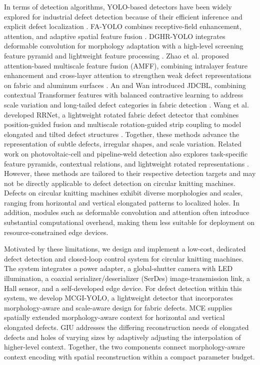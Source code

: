 \documentclass[journal]{IEEEtranTIE}
\newcommand{\model}{MCGI-YOLO\xspace}
\begin{document}
In terms of detection algorithms, YOLO-based detectors have been widely explored for industrial defect detection because of their efficient inference and explicit defect localization \cite{redmon2016yolo}. FA-YOLO combines receptive-field enhancement, attention, and adaptive spatial feature fusion \cite{yu2024fayolo}. DGHR-YOLO integrates deformable convolution for morphology adaptation with a high-level screening feature pyramid and lightweight feature processing \cite{zhang2025dghr}. Zhao et al. proposed attention-based multiscale feature fusion (AMFF), combining intralayer feature enhancement and cross-layer attention to strengthen weak defect representations on fabric and aluminum surfaces \cite{zhao2024amff}. An and Wan introduced JDCBL, combining contextual Transformer features with balanced contrastive learning to address scale variation and long-tailed defect categories in fabric detection \cite{an2025jdcbl}. Wang et al. developed RRNet, a lightweight rotated fabric defect detector that combines position-guided fusion and multiscale rotation-guided strip coupling to model elongated and tilted defect structures \cite{wang2026rrnet}. Together, these methods advance the representation of subtle defects, irregular shapes, and scale variation. Related work on photovoltaic-cell and pipeline-weld detection also explores task-specific feature pyramids, contextual relations, and lightweight rotated representations \cite{su2022baf,shen2024crnet,liu2025lrnet}. However, these methods are tailored to their respective detection targets and may not be directly applicable to defect detection on circular knitting machines. Defects on circular knitting machines exhibit diverse morphologies and scales, ranging from horizontal and vertical elongated patterns to localized holes. In addition, modules such as deformable convolution and attention often introduce substantial computational overhead, making them less suitable for deployment on resource-constrained edge devices.

Motivated by these limitations, we design and implement a low-cost, dedicated defect detection and closed-loop control system for circular knitting machines. The system integrates a power adapter, a global-shutter camera with LED illumination, a coaxial serializer/deserializer (SerDes) image-transmission link, a Hall sensor, and a self-developed edge device. For defect detection within this system, we develop \model, a lightweight detector that incorporates morphology-aware and scale-aware design for fabric defects. MCE supplies spatially extended morphology-aware context for horizontal and vertical elongated defects. GIU addresses the differing reconstruction needs of elongated defects and holes of varying sizes by adaptively adjusting the interpolation of higher-level context. Together, the two components connect morphology-aware context encoding with spatial reconstruction within a compact parameter budget.
\end{document}
